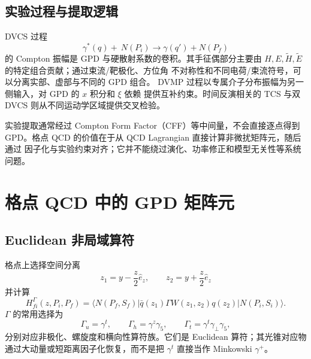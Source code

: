 \documentclass[12pt,a4paper]{ctexart}
\theoremstyle{definition}
\begin{document}
\subsection{实验过程与提取逻辑}

DVCS 过程
\begin{equation}
\gamma^*(q)+\ N(P_i)\longrightarrow \gamma(q')+N(P_f)
\label{eq:dvcs}
\end{equation}
的 Compton 振幅是 GPD 与硬散射系数的卷积。其手征偶部分主要由
$H,E,\widetilde H,\widetilde E$ 的特定组合贡献；通过束流/靶极化、方位角
不对称性和不同电荷/束流符号，可以分离实部、虚部与不同的 GPD 组合。
DVMP 过程以专属介子分布振幅为另一侧输入，对 GPD 的 $x$ 积分和 $\xi$ 依赖
提供互补约束。时间反演相关的 TCS 与双 DVCS 则从不同运动学区域提供交叉检验。

实验提取通常经过 Compton Form Factor（CFF）等中间量，不会直接逐点得到
GPD。格点 QCD 的价值在于从 QCD Lagrangian 直接计算非微扰矩阵元，随后通过
因子化与实验约束对齐；它并不能绕过演化、功率修正和模型无关性等系统问题。

\section{格点 QCD 中的 GPD 矩阵元}

\subsection{Euclidean 非局域算符}

格点上选择空间分离
\begin{equation}
z_1=y-\frac{z}{2}\hat e_z,\qquad
z_2=y+\frac{z}{2}\hat e_z
\label{eq:euclidean-endpoints}
\end{equation}
并计算
\begin{equation}
H^{\Gamma}_{fi}(z,P_i,P_f)
=\langle N(P_f,S_f)|\bar q(z_1)\Gamma
W(z_1,z_2)q(z_2)|N(P_i,S_i)\rangle .
\label{eq:euclidean-qgpd-matrix}
\end{equation}
$\Gamma$ 的常用选择为
\begin{equation}
\Gamma_u=\gamma^t,\qquad
\Gamma_h=\gamma^z\gamma_5,\qquad
\Gamma_t=\gamma^t\gamma_\perp\gamma_5,
\label{eq:gamma-choices}
\end{equation}
分别对应非极化、螺旋度和横向性算符族。它们是 Euclidean 算符；其光锥对应物
通过大动量或短距离因子化恢复，而不是把 $\gamma^t$ 直接当作 Minkowski
$\gamma^+$。
\end{document}
